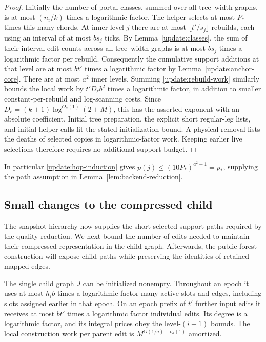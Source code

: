 \begin{proof}
Initially the number of portal classes, summed over all tree--width
graphs, is at most $(n_i/k)$ times a logarithmic factor.  The helper
selects at most $P_*$ times this many chords.  At inner level $j$ there
are at most $\lfloor t'/s_j\rfloor$ rebuilds, each using an interval
of at most $bs_j$ ticks.  By Lemma~\ref{update:classes}, the sum of
their interval edit counts across all tree--width graphs is at most
$bs_j$ times a logarithmic factor per rebuild.  Consequently the
cumulative support additions at that level are at most $bt'$ times
a logarithmic factor by Lemma~\ref{update:anchor-core}.  There are at
most $a^2$ inner levels.  Summing
\eqref{update:rebuild-work} similarly bounds the local work by
$t'D_\ell b^2$ times a logarithmic factor, in addition to smaller
constant-per-rebuild and log-scanning costs.  Since
$D_\ell=(k+1)\log^{O_a(1)}(2+M)$, this has the asserted exponent with
an absolute coefficient.  Initial tree preparation, the explicit
short regular-leg lists, and initial helper calls fit the stated
initialization bound.  A physical removal lists the deaths of selected
copies in logarithmic-factor work.  Keeping earlier live selections
therefore requires no additional support budget.
\end{proof}

In particular \eqref{update:hop-induction} gives
$p(j)\le(10P_*)^{a^2+1}=p_*$, supplying the path assumption in
Lemma~\ref{lem:backend-reduction}.

\subsection{Small changes to the compressed child}

The snapshot hierarchy now supplies the short selected-support paths
required by the quality reduction.  We next bound the number of edits
needed to maintain their compressed representation in the child graph.
Afterwards, the public forest construction will expose child paths
while preserving the identities of retained mapped edges.

\begin{lemma}
\label{update:compressed-edits}
The single child graph $J$ can be initialized nonempty.  Throughout
an epoch it uses at most $h_ib$ times a logarithmic factor many active
slots and edges, including slots assigned earlier in that epoch.
On an epoch prefix of $t'$ further input edits it receives at most
$bt'$ times a logarithmic factor individual edits.  Its degree is a
logarithmic factor, and its integral prices obey the level-$(i+1)$
bounds.  The local construction work per parent edit is
$M^{O(1/a)+o_a(1)}$ amortized.
\end{lemma}

